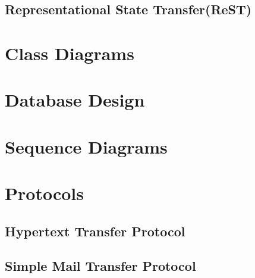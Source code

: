 \subsection{Representational State Transfer(ReST)}
\section{Class Diagrams}
\section{Database Design}
\section{Sequence Diagrams}
\section{Protocols}
\subsection*{Hypertext Transfer Protocol}
\subsection*{Simple Mail Transfer Protocol}


